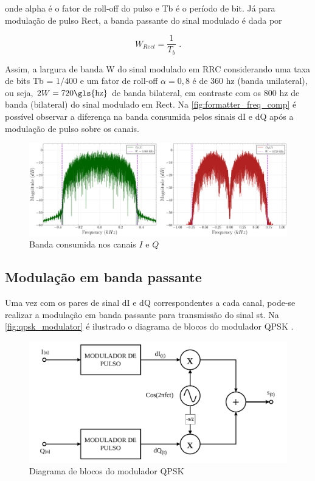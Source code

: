 \noindent onde \gls{alpha} é o fator de roll-off do pulso e \gls{Tb} é o período de bit. Já para modulação de pulso \gls{Rect}, a banda passante do sinal modulado é dada por

\vspace{-1em}
\begin{equation}
    W_{Rect} = \frac{1}{T_b} \text{ .}
\end{equation}

\noindent Assim, a largura de banda \gls{W} do sinal modulado em \gls{RRC} considerando uma taxa de bits \gls{Tb} = $1 / 400$ e um fator de roll-off $\alpha = 0{,}8$ é de 360 \gls{hz} (banda unilateral), ou seja, $2W = 720 \text{\gls{hz}}$ de banda bilateral, em contraste com os 800 \gls{hz} de banda (bilateral) do sinal modulado em \gls{Rect}. Na \autoref{fig:formatter_freq_comp} é possível observar a diferença na banda consumida pelos sinais \gls{dI} e \gls{dQ} após a modulação de pulso sobre os canais.

\begin{figure}[H]
	\caption{Banda consumida nos canais $I$ e $Q$}\label{fig:formatter_freq_comp}
	\includegraphics[width=\linewidth]{assets/cap2/example_formatter_freq_comp.pdf}
\end{figure}

\subsection{Modulação em banda passante} 

Uma vez com os pares de sinal \gls{dI} e \gls{dQ} correspondentes a cada canal, pode-se realizar a modulação em banda passante para transmissão do sinal \gls{st}. Na \autoref{fig:qpsk_modulator} é ilustrado o diagrama de blocos do modulador \gls{QPSK} \cite{cnes_services_and_message_formats_ed2_rev2_2006}.

\begin{figure}[H]
	\centering
	\caption{Diagrama de blocos do modulador QPSK}\label{fig:qpsk_modulator}
	\includegraphics[width=\linewidth]{assets/cap2/qpsk_modulator.pdf}
\end{figure}

